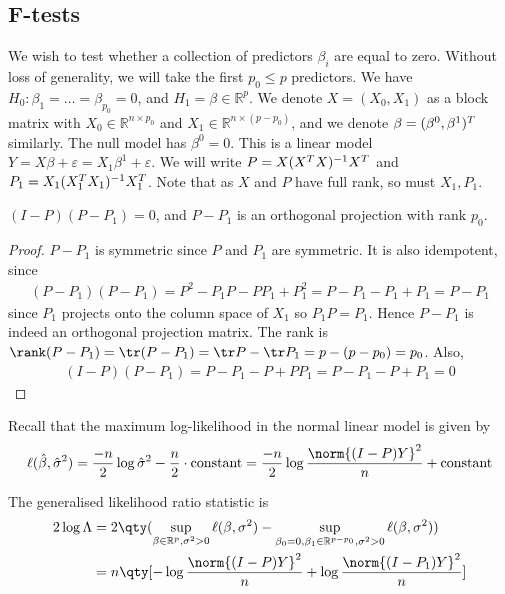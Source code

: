 \subsection{F-tests}
We wish to test whether a collection of predictors $\beta_i$ are equal to zero.
Without loss of generality, we will take the first $p_0 \leq p$ predictors.
We have $H_0 \colon \beta_1 = \dots = \beta_{p_0} = 0$, and $H_1 = \beta \in \mathbb R^p$.
We denote $X = (X_0, X_1)$ as a block matrix with $X_0 \in \mathbb R^{n \times p_0}$ and $X_1 \in \mathbb R^{n \times (p-p_0)}$, and we denote $\beta = (\beta^0, \beta^1)^T$ similarly.
The null model has $\beta^0 = 0$.
This is a linear model $Y = X\beta + \varepsilon = X_1 \beta^1 + \varepsilon$.
We will write $P = X(X^T X)^{-1} X^T$ and $P_1 = X_1 (X_1^T X_1)^{-1} X_1^T$.
Note that as $X$ and $P$ have full rank, so must $X_1, P_1$.

\begin{lemma}
	$(I-P)(P - P_1) = 0$, and $P - P_1$ is an orthogonal projection with rank $p_0$.
\end{lemma}

\begin{proof}
	$P - P_1$ is symmetric since $P$ and $P_1$ are symmetric.
	It is also idempotent, since
	\begin{align*}
		(P-P_1)(P-P_1) = P^2 - P_1 P - P P_1 + P_1^2 = P - P_1 - P_1 + P_1 = P - P_1
	\end{align*}
	since $P_1$ projects onto the column space of $X_1$ so $P_1 P = P_1$.
	Hence $P - P_1$ is indeed an orthogonal projection matrix.
	The rank is $\rank(P - P_1) = \tr(P - P_1) = \tr P - \tr P_1 = p - (p - p_0) = p_0$.
	Also,
	\begin{align*}
		(I-P)(P-P_1) = P-P_1 - P + PP_1 = P-P_1 - P + P_1 = 0
	\end{align*}
\end{proof}

Recall that the maximum log-likelihood in the normal linear model is given by
\begin{align*}
	\ell(\hat \beta, \hat \sigma^2) = \frac{-n}{2} \log \hat\sigma^2 - \frac{n}{2} \cdot \text{constant} = \frac{-n}{2} \log \frac{\norm{(I-P)Y}^2}{n} + \text{constant}
\end{align*}

The generalised likelihood ratio statistic is
\begin{align*}
	2 \log \Lambda &= 2\qty( \sup_{\beta \in \mathbb R^p,\sigma^2>0} \ell(\beta, \sigma^2) -  \sup_{\beta_0 = 0, \beta_1 \in \mathbb R^{p-p_0},\sigma^2>0} \ell(\beta, \sigma^2) )\\
	&= n \qty[ -\log \frac{\norm{(I-P)Y}^2}{n} + \log \frac{\norm{(I-P_1)Y}^2}{n} ]
\end{align*}

